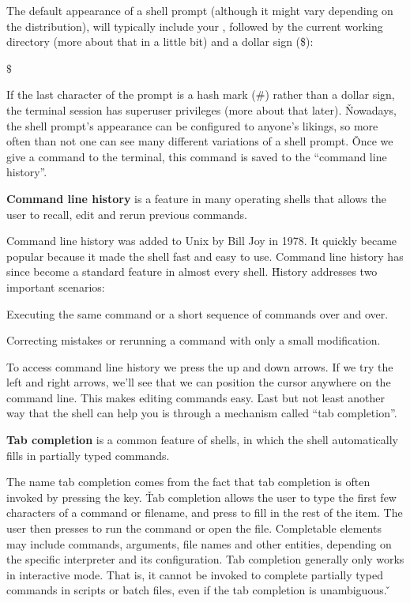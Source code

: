 The default appearance of a shell prompt (although it might vary depending on the distribution), will typically include
your , followed by the current working directory (more about that in a little bit) and a
dollar sign (\$):
\begin{bash}
$\$$
\end{bash}

If the last character of the prompt is a hash mark (\#) rather than a dollar sign, the terminal session has superuser
privileges (more about that later). \v

Nowadays, the shell prompt's appearance can be configured to anyone's likings, so more often than not one can see many
different variations of a shell prompt. \v

Once we give a command to the terminal, this command is saved to the ``command line history''.

\textbf{Command line history} is a feature in many operating shells that allows the user to recall, edit and rerun
previous commands.
\ed

Command line history was added to Unix by Bill Joy in 1978. It quickly became popular because it made the shell fast
and easy to use. Command line history has since become a standard feature in almost every shell. \v

History addresses two important scenarios:
\bit
\item Executing the same command or a short sequence of commands over and over.
\item Correcting mistakes or rerunning a command with only a small modification.
\eit

To access command line history we press the up and down arrows. If we try the left and right arrows, we'll see that we
can position the cursor anywhere on the command line. This makes editing commands easy. \v

Last but not least another way that the shell can help you is through a mechanism called ``tab completion''.

\textbf{Tab completion} is a common feature of shells, in which the shell automatically fills in partially typed
commands.
\ed

The name tab completion comes from the fact that tab completion is often invoked by pressing the  key. \v

Tab completion allows the user to type the first few characters of a command or filename, and press  to
fill in the rest of the item. The user then presses  to run the command or open the file. Completable
elements may include commands, arguments, file names and other entities, depending on the specific interpreter and
its configuration. Tab completion generally only works in interactive mode. That is, it cannot be invoked to complete
partially typed commands in scripts or batch files, even if the tab completion is unambiguous. \v

